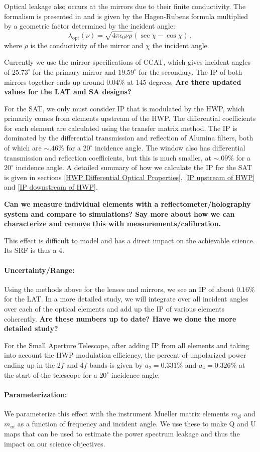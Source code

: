 Optical leakage also occurs at the mirrors due to their finite conductivity. 
The formalism is presented in \cite{Barkats:2005sh} and is given by the Hagen-Rubens formula multiplied by 
a geometric factor determined by the incident angle:
\begin{equation}
\lambda_\text{opt}(\nu) = \sqrt{4 \pi \epsilon_0 \nu \rho} (\sec \chi - \cos \chi) \, ,
\end{equation}
where $\rho$ is the conductivity of the mirror and $\chi$ the incident angle.

Currently we use the mirror specifications of CCAT, which gives incident angles of $25.73^\circ$ for the primary mirror 
and $19.59^\circ$ for the secondary. The IP of both mirrors together ends up around $0.04\%$ at 145 degrees. \textbf{Are there updated values for the LAT and SA designs?}


For the SAT, we only must consider IP that is modulated by the HWP, which primarily comes from elements upstream of the HWP.
The differential coefficients for each element are calculated using the transfer matrix method.
The IP is dominated by the differential transmission and reflection of Alumina filters, both of which are $\sim.46\%$ for a $20^\circ$ incidence angle. 
The window also has differential transmission and reflection coefficients, but this is much smaller,
at $\sim.09\%$ for a $20^\circ$ incidence angle.
A detailed summary of how we calculate the IP for the SAT is given in sections \ref{HWP Differential Optical Properties},
\ref{IP upstream of HWP} and \ref{IP downstream of HWP}. 

\textbf{Can we measure individual elements with a reflectometer/holography system and compare to simulations? Say more about how we can characterize and remove this with measurements/calibration.}

This effect is difficult to model and has a direct impact on the achievable science. Its SRF is thus a 4.

\paragraph{Uncertainty/Range:}
Using the methods above for the lenses and mirrors, we see an IP of about $0.16\%$ for the LAT.
In a more detailed study, we will integrate over all incident angles over each of the optical elements and add up the IP of various elements coherently. \textbf{Are these numbers up to date? Have we done the more detailed study?}

For the Small Aperture Telescope, after adding IP from all elements and taking into account the HWP modulation efficiency,
the percent of unpolarized power ending up in the 2$f$ and 4$f$ bands is given by $a_2 = 0.331\%$ and $a_4 = 0.326\%$ 
at the start of the telescope for a $20^\circ$ incidence angle.

\paragraph{Parameterization:}
We parameterize this effect with the instrument Mueller matrix elements $m_{qi}$ and $m_{ui}$ as a function of frequency and incident angle. We use these to make Q and U maps that can be used to estimate the power spectrum leakage and thus the impact on our science objectives.

